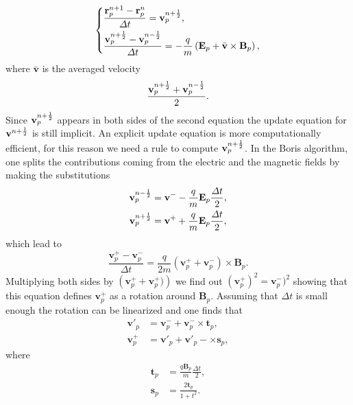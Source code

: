\begin{equation*}
    \begin{dcases}
        \frac{\mathbf{r}^{n+1}_p - \mathbf{r}^n_p}{\Delta t} = \mathbf{v}^{n+\frac{1}{2}}_p,\\
        \frac{\mathbf{v}^{n+\frac{1}{2}}_p - \mathbf{v}^{n-\frac{1}{2}}_p}{\Delta t} = -\frac{q}{m}\left( \mathbf{E}_p + \bar{\mathbf{v}}\times\mathbf{B}_p \right),
    \end{dcases}
\end{equation*}
where $\bar{\mathbf{v}}$ is the averaged velocity $$\frac{\mathbf{v}^{n+\frac{1}{2}}_p + \mathbf{v}^{n-\frac{1}{2}}_p}{2}.$$
Since $\mathbf{v}^{n+\frac{1}{2}}_p$ appears in both sides of the second equation the update equation for $\mathbf{v}^{n+\frac{1}{2}}$ is still implicit. An explicit update equation is more computationally efficient, for this reason we need a rule to compute $\mathbf{v}^{n+\frac{1}{2}}_p$. In the Boris algorithm, one splits the contributions coming from the electric and the magnetic fields by making the substitutions
\begin{equation}
    \label{eq:subsv}
    \begin{split}
        \mathbf{v}^{n-\frac{1}{2}}_p &= \mathbf{v}^- - \frac{q}{m}\mathbf{E}_p \frac{\Delta t}{2},\\
        \mathbf{v}^{n+\frac{1}{2}}_p &= \mathbf{v}^+ + \frac{q}{m}\mathbf{E}_p \frac{\Delta t}{2},
    \end{split}
\end{equation}
which lead to
\begin{equation*}
    \frac{\mathbf{v}^+_p - \mathbf{v}^-_p}{\Delta t} = \frac{q}{2m} \left(\mathbf{v}^+_p + \mathbf{v}^-_p \right) \times \mathbf{B}_p.
\end{equation*}
Multiplying both sides by $\left(\mathbf{v}^+_p + \mathbf{v}^+_p)\right)$ we find out $(\mathbf{v}^+_p)^2 = \mathbf{v}^-_p)^2$ showing that this equation defines $\mathbf{v}^+_p$ as a rotation around $\mathbf{B}_p$. Assuming that $\Delta t$ is small enough the rotation can be linearized and one finds that
\begin{equation}
\label{eq:v+}
\begin{split}
    \mathbf{v}'_p &= \mathbf{v}^-_p + \mathbf{v}^-_p\times\mathbf{t}_p,\\
    \mathbf{v}^+_p &= \mathbf{v}'_p + \mathbf{v}'_p-\times\mathbf{s}_p,
\end{split}    
\end{equation}
where
\begin{equation}
\label{eq:t&s}
\begin{split}
    \mathbf{t}_p &= \frac{q\mathbf{B}_p}{m} \frac{\Delta t}{2},\\
    \mathbf{s}_p &= \frac{2\mathbf{t}_p}{1+t^2}.
\end{split}    
\end{equation}
